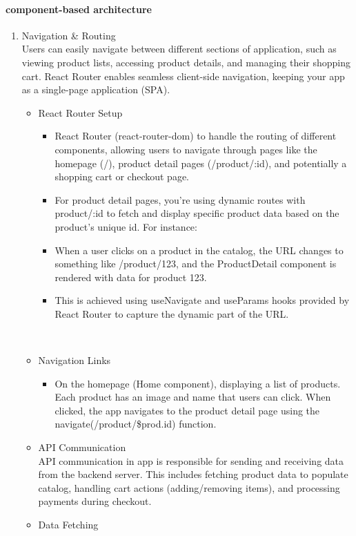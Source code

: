 \documentclass{llncs}
\begin{document}
\paragraph{component-based architecture}
\begin{enumerate}
    \item Navigation \& Routing \\
    Users can easily navigate between different sections of application, such as viewing product lists, accessing product details, and managing their shopping cart. React Router enables seamless client-side navigation, keeping your app as a single-page application (SPA).
    \begin{itemize}
        \item React Router Setup 
        \begin{itemize}
            \item React Router (react-router-dom) to handle the routing of different components, allowing users to navigate through pages like the homepage (/), product detail pages (/product/:id), and potentially a shopping cart or checkout page.
            \item For product detail pages, you're using dynamic routes with product/:id to fetch and display specific product data based on the product’s unique id. For instance:
            \item When a user clicks on a product in the catalog, the URL changes to something like /product/123, and the ProductDetail component is rendered with data for product 123.
            \item This is achieved using useNavigate and useParams hooks provided by React Router to capture the dynamic part of the URL.
        \end{itemize}
        \ 
        \item Navigation Links
        \begin{itemize}
            \item On the homepage (Home component), displaying a list of products. Each product has an image and name that users can click. When clicked, the app navigates to the product detail page using the navigate(/product/\${prod.id}) function.
        \end{itemize}
            \item API Communication \\
            API communication in app is responsible for sending and receiving data from the backend server. This includes fetching product data to populate catalog, handling cart actions (adding/removing items), and processing payments during checkout.
        \item Data Fetching
    \end{itemize}
 
\end{enumerate}
\end{document}
